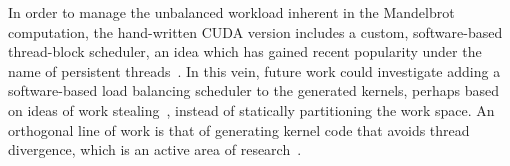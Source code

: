 In order to manage the unbalanced workload inherent in the Mandelbrot
computation, the hand-written CUDA version includes a custom, software-based
thread-block scheduler, an idea which has gained recent popularity under the
name of persistent threads~\cite{Gupta:2014ik}. In this vein, future work could
investigate adding a software-based load balancing scheduler to the generated
kernels, perhaps based on ideas of work
stealing~\cite{Randall:1998,Tzannes:2010il}, instead of statically partitioning
the work space. An orthogonal line of work is that of generating kernel code
that avoids thread divergence, which is an active area of
research~\cite{Zhang:2010jc}.

%
%
%

